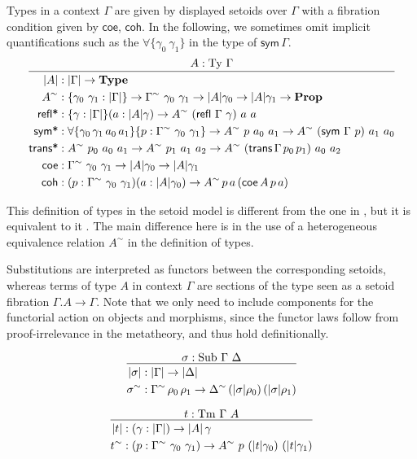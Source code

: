 \documentclass[autoref]{llncs}
\newcommand{\GG}{\Gamma}
\newcommand{\GD}{\Delta}
\newcommand{\mType}{\mathbf{Type}}
\newcommand{\mProp}{\mathbf{Prop}}
\newcommand{\Ty}{\mathrm{Ty}}
\newcommand{\Tm}{\mathrm{Tm}}
\newcommand{\Sub}{\mathrm{Sub}}
\begin{document}
Types in a context $\GG$ are given by displayed setoids over $\GG$
with a fibration condition given by $\textsf{coe}$, $\textsf{coh}$. In
the following, we sometimes omit implicit quantifications such as the $\forall\{\gamma_0\ \gamma_1\}$ in the type of $\textsf{sym}\,\GG$.
{\small\[
\infer{
  \begin{aligned}
    | A | &: | \GG | \to \mType \\
    A^\sim &: \{\gamma_0\ \gamma_1 : | \GG |\}
    \to \GG^\sim\ \gamma_0\ \gamma_1 \to | A | \gamma_0 \to | A | \gamma_1 \to \mProp \\
    \textsf{refl*} &: \{\gamma : | \GG | \} (a : | A | \gamma) \to A^\sim\ (\textsf{refl}\ \GG\ \gamma)\ a\ a \\
    \textsf{sym*} &: \forall\{\gamma_0\,\gamma_1\,a_0\,a_1\}\{p : \GG^\sim\ \gamma_0\ \gamma_1\}
    \to A^\sim\ p\ a_0\ a_1 \to A^\sim\ (\textsf{sym}\ \GG\ p)\ a_1\ a_0 \\
    \textsf{trans*} &: A^\sim\ p_0\ a_0\ a_1\to A^\sim\ p_1\ a_1\ a_2\to A^\sim\ (\textsf{trans}\,\GG\,p_0\,p_1)\ a_0\ a_2\\
    \textsf{coe} &: \GG^\sim\ \gamma_0\ \gamma_1 \to | A | \gamma_0 \to | A | \gamma_1 \\
    \textsf{coh} &: (p : \GG^\sim\ \gamma_0\ \gamma_1) (a : | A | \gamma_0)
    \to A^\sim\,p\,a\,(\textsf{coe}\,A\,p\,a) \\
  \end{aligned}
}{
  A : \Ty\ \GG
}
\]}\vspace{-1em}

This definition of types in the setoid model is different from the one in
\cite{setoid99}, but it is equivalent to it \cite[Section 1.6.1]{simonthesis}. The main
difference here is in the use of a heterogeneous equivalence relation $A^\sim$
in the definition of types.

Substitutions are interpreted as functors between the corresponding setoids,
whereas terms of type $A$ in context $\GG$ are sections of the type seen as a
setoid fibration $\GG . A \to \GG$. Note that we only need to include components
for the functorial action on objects and morphisms, since the functor laws
follow from proof-irrelevance in the metatheory, and thus hold definitionally.
\\
{\small\begin{minipage}{0.5\textwidth}
\[
\infer{
  \begin{aligned}
    | \sigma | &: | \GG | \to | \GD | \\
    \sigma^\sim &: \GG^\sim\, \rho_0\, \rho_1 \to \GD^\sim\, (|\sigma|\rho_0)\, (|\sigma|\rho_1)
  \end{aligned}
}{
  \sigma : \Sub\ \GG\ \GD
}
\]
\end{minipage}
\begin{minipage}{0.5\textwidth}
\[
\infer{
  \begin{aligned}
    | t | &: (\gamma : | \GG |) \to | A | \, \gamma \\
    t^\sim &: (p : \GG^\sim\ \gamma_0\ \gamma_1) \to A^\sim\ p\ (|t|\gamma_0)\ (|t|\gamma_1)
  \end{aligned}
}{
  t : \Tm\ \GG\ A
}
\]
\end{minipage}
\\}
\end{document}
